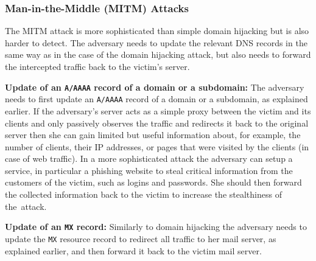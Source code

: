 \subsubsection{Man-in-the-Middle (MITM) Attacks}
The MITM attack is more sophisticated than simple domain hijacking but is also harder to detect. 
The adversary needs to update the relevant DNS records in the same way as in the case of the domain hijacking attack, but also needs to forward the intercepted traffic back to the victim's server.

\textbf{Update of an \texttt{A/AAAA} record of a domain or a subdomain:}
The adversary needs to first update an \texttt{A/AAAA} record of a domain or a subdomain, as explained earlier.
If the adversary's server acts as a simple proxy between the victim and its clients and only passively observes the traffic and redirects it back to the original server then she can gain limited but useful information about, for example, the number of clients, their IP addresses, or pages that were visited by the clients  (in case of web traffic). 
In a more sophisticated attack the adversary can setup a service, in particular a phishing website to steal critical information from the customers of the victim, such as logins and passwords. 
She should then forward the collected information back to the victim to increase the stealthiness of the~attack. 

\textbf{Update of an \texttt{MX} record:} 
Similarly to domain hijacking the adversary needs to update the \texttt{MX} resource record to redirect all traffic to her mail server, as explained earlier, %
and then forward it back to the victim mail server.







